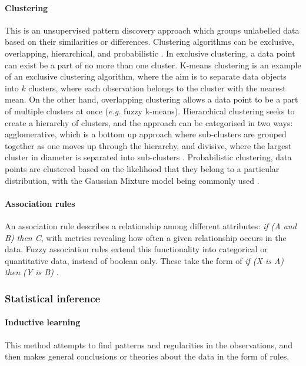 \paragraph{Clustering}
This is an unsupervised pattern discovery approach which groups unlabelled data based on their similarities or differences. Clustering algorithms can be exclusive, overlapping, hierarchical, and probabilistic \citep{IBM}. In exclusive clustering, a data point can exist be a part of no more than one cluster. K-means clustering is an example of an exclusive clustering algorithm, where the aim is to separate data objects into $k$ clusters, where each observation belongs to the cluster with the nearest mean. On the other hand, overlapping clustering allows a data point to be a part of multiple clusters at once (\textit{e.g.} fuzzy k-means). Hierarchical clustering seeks to create a hierarchy of clusters, and the approach can be categorised in two ways: agglomerative, which is a bottom up approach where sub-clusters are grouped together as one moves up through the hierarchy, and divisive, where the largest cluster in diameter is separated into sub-clusters \citep{Khraisat2019}. Probabilistic clustering, data points are clustered based on the likelihood that they belong to a particular distribution, with the Gaussian Mixture model being commonly used \citep{IBM}.

\paragraph{Association rules}
An association rule describes a relationship among different attributes: \emph{if (A and B) then C}, with metrics revealing how often a given relationship occurs in the data. Fuzzy association rules extend this functionality into categorical or quantitative data, instead of boolean only. These take the form of \emph{if (X is A) then (Y is B)} \citep{Buczak2016}.

\subsubsection{Statistical inference}

\paragraph{Inductive learning}
This method attempts to find patterns and regularities in the observations, and then makes general conclusions or theories about the data in the form of rules.

